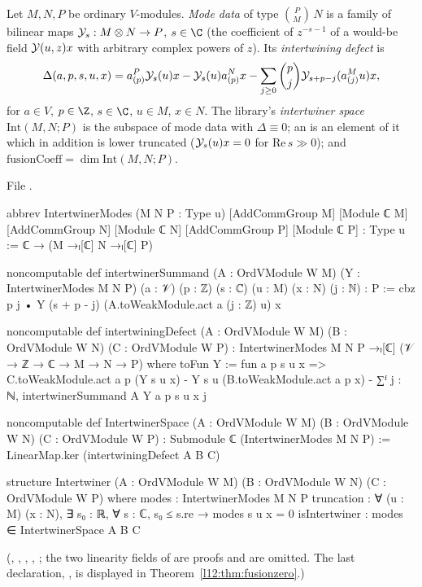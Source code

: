 \begin{definition}\label{l12:def:intertwiner}
Let $M,N,P$ be ordinary $V$-modules. \emph{Mode data} of type $\binom PM\,N$ is a family of bilinear maps
$\mathcal{Y}_s:M\otimes N\to P$, $s\in\C$ (the coefficient of $z^{-s-1}$ of a would-be field $\mathcal{Y}(u,z)x$ with arbitrary
complex powers of $z$). Its \emph{intertwining defect} is
\begin{equation*}
 \Delta(a,p,s,u,x) = a^P_{(p)}\mathcal{Y}_s(u)x - \mathcal{Y}_s(u)a^N_{(p)}x - \sum_{j\ge0}\binom pj\mathcal{Y}_{s+p-j}(a^M_{(j)}u)x ,
\end{equation*}
for $a\in V$, $p\in\Z$, $s\in\C$, $u\in M$, $x\in N$. The library's \emph{intertwiner space} $\mathrm{Int}(M,N;P)$ is the subspace of mode data
with $\Delta\equiv0$; an  is an element of it which in addition is lower truncated ($\mathcal{Y}_s(u)x = 0$ for
$\mathrm{Re}\,s\gg0$); and $\mathrm{fusionCoeff} = \dim\mathrm{Int}(M,N;P)$.
\end{definition}
\noindent File .
\begin{leancode}
abbrev IntertwinerModes (M N P : Type u) [AddCommGroup M] [Module ℂ M] [AddCommGroup N]
    [Module ℂ N] [AddCommGroup P] [Module ℂ P] : Type u := ℂ → (M →ₗ[ℂ] N →ₗ[ℂ] P)

noncomputable def intertwinerSummand (A : OrdVModule W M) (Y : IntertwinerModes M N P)
    (a : 𝒱) (p : ℤ) (s : ℂ) (u : M) (x : N) (j : ℕ) : P :=
  cbz p j • Y (s + p - j) (A.toWeakModule.act a (j : ℤ) u) x

noncomputable def intertwiningDefect (A : OrdVModule W M) (B : OrdVModule W N) (C : OrdVModule W P) :
    IntertwinerModes M N P →ₗ[ℂ] (𝒱 → ℤ → ℂ → M → N → P) where
  toFun Y := fun a p s u x =>
    C.toWeakModule.act a p (Y s u x) - Y s u (B.toWeakModule.act a p x)
      - ∑ᶠ j : ℕ, intertwinerSummand A Y a p s u x j

noncomputable def IntertwinerSpace (A : OrdVModule W M) (B : OrdVModule W N) (C : OrdVModule W P) :
    Submodule ℂ (IntertwinerModes M N P) :=
  LinearMap.ker (intertwiningDefect A B C)

structure Intertwiner (A : OrdVModule W M) (B : OrdVModule W N) (C : OrdVModule W P) where
  modes : IntertwinerModes M N P
  truncation : ∀ (u : M) (x : N), ∃ s₀ : ℝ, ∀ s : ℂ, s₀ ≤ s.re → modes s u x = 0
  isIntertwiner : modes ∈ IntertwinerSpace A B C
\end{leancode}
(, , , ,
; the two linearity fields of  are proofs and are omitted. The last
declaration, , is displayed in Theorem~\ref{l12:thm:fusionzero}.)

